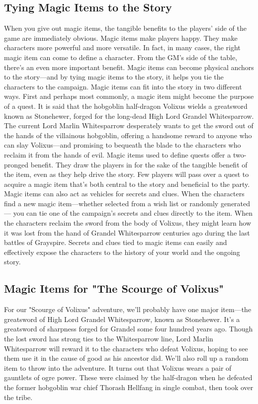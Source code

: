 \documentclass[10pt,a4paper,twoside,bg=print,twocolumn,openany,nodeprecatedcode]{dndbook}
\begin{document}
\subsection{Tying Magic Items to the Story}
When you give out magic items, the tangible benefits to the players' side of the game are immediately obvious. Magic items make players happy. They make characters more powerful and more versatile. In fact, in many cases, the right magic item can come to define a character.
From the GM's side of the table, there's an even more important benefit. Magic items can become physical anchors to the story—and by tying magic items to the story, it helps you tie the characters to the campaign.
Magic items can fit into the story in two different ways. First and perhaps most commonly, a magic item might become the purpose of a quest. It is said that the hobgoblin half-dragon Volixus wields a greatsword known as Stonehewer, forged for the long-dead High Lord Grandel Whitesparrow. The current Lord Marlin Whitesparrow desperately wants to get the sword out of the hands of the villainous hobgoblin, offering a handsome reward to anyone who can slay Volixus—and promising to bequeath the blade to the characters who reclaim it from the hands of evil.
Magic items used to define quests offer a two-pronged benefit. They draw the players in for the sake of the tangible benefit of the item, even as they help drive the story. Few players will pass over a quest to acquire a magic item that's both central to the story and beneficial to the party.
Magic items can also act as vehicles for secrets and clues. When the characters find a new magic item—whether selected from a wish list or randomly generated— you can tie one of the campaign's secrets and clues directly to the item. When the characters reclaim the sword from the body of Volixus, they might learn how it was lost from the hand of Grandel Whitesparrow centuries ago during the last battles of Grayspire. Secrets and clues tied to magic items can easily and effectively expose the characters to the history of your world and the ongoing story.
\subsection{Magic Items for "The Scourge of Volixus"}
For our "Scourge of Volixus" adventure, we'll probably have one major item—the greatsword of High Lord Grandel Whitesparrow, known as Stonehewer. It's a greatsword of sharpness forged for Grandel some four hundred years ago. Though the lost sword has strong ties to the Whitesparrow line, Lord Marlin Whitesparrow will reward it to the characters who defeat Volixus, hoping to see them use it in the cause of good as his ancestor did.
We'll also roll up a random item to throw into the adventure. It turns out that Volixus wears a pair of gauntlets of ogre power. These were claimed by the half-dragon when he defeated the former hobgoblin war chief Thorash Hellfang in single combat, then took over the tribe.
\end{document}
